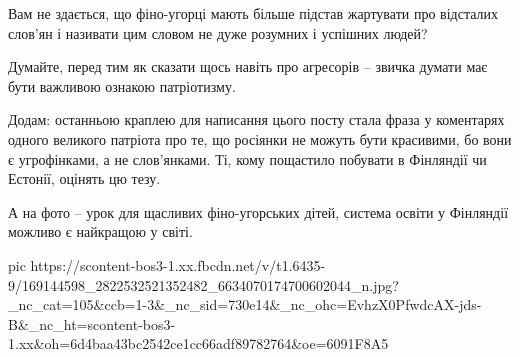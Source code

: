 Вам не здається, що фіно-угорці мають більше підстав жартувати про відсталих
слов’ян і називати цим словом не дуже розумних і успішних людей?

Думайте, перед тим як сказати щось навіть про агресорів – звичка думати має
бути важливою ознакою патріотизму.

Додам: останньою краплею для написання цього посту стала фраза у коментарях
одного великого патріота про те, що росіянки не можуть бути красивими, бо вони
є угрофінками, а не слов’янками. Ті, кому пощастило побувати в Фінляндії чи
Естонії, оцінять цю тезу.

А на фото – урок для щасливих фіно-угорських дітей, система освіти у Фінляндії
можливо є найкращою у світі.

\ifcmt
  pic https://scontent-bos3-1.xx.fbcdn.net/v/t1.6435-9/169144598_2822532521352482_6634070174700602044_n.jpg?_nc_cat=105&ccb=1-3&_nc_sid=730e14&_nc_ohc=EvhzX0PfwdcAX-jds-B&_nc_ht=scontent-bos3-1.xx&oh=6d4baa43bc2542ce1cc66adf89782764&oe=6091F8A5
\fi


